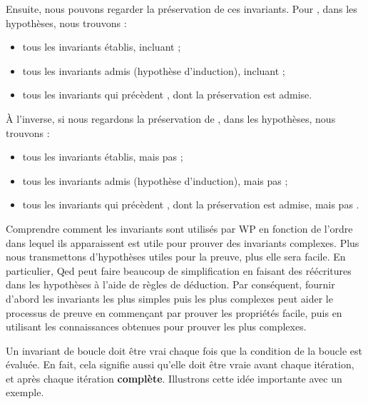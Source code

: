 

Ensuite, nous pouvons regarder la préservation de ces invariants. Pour
, dans les hypothèses, nous trouvons :
\begin{itemize}
  \item tous les invariants établis, incluant  ;
  \item tous les invariants admis (hypothèse d'induction), incluant  ;
  \item tous les invariants qui précèdent , dont la préservation est admise.
\end{itemize}




À l'inverse, si nous regardons la préservation de , dans les
hypothèses, nous trouvons :
\begin{itemize}
  \item tous les invariants établis, mais pas  ;
  \item tous les invariants admis (hypothèse d'induction), mais pas  ;
  \item tous les invariants qui précèdent , dont la préservation
        est admise, mais pas .
\end{itemize}




Comprendre comment les invariants sont utilisés par WP en fonction de l'ordre
dans lequel ils apparaissent est utile pour prouver des invariants complexes.
Plus nous transmettons d'hypothèses utiles pour la preuve, plus elle sera facile.
En particulier, Qed peut faire beaucoup de simplification en faisant des
réécritures dans les hypothèses à l'aide de règles de déduction. Par conséquent,
fournir d'abord les invariants les plus simples puis les plus complexes peut
aider le processus de preuve en commençant par prouver les propriétés facile,
puis en utilisant les connaissances obtenues pour prouver les plus complexes.




Un invariant de boucle doit être vrai chaque fois que la condition de la boucle est
évaluée. En fait, cela signifie aussi qu'elle doit être vraie avant chaque itération,
et après chaque itération \textbf{complète}. Illustrons cette idée importante avec un
exemple.




